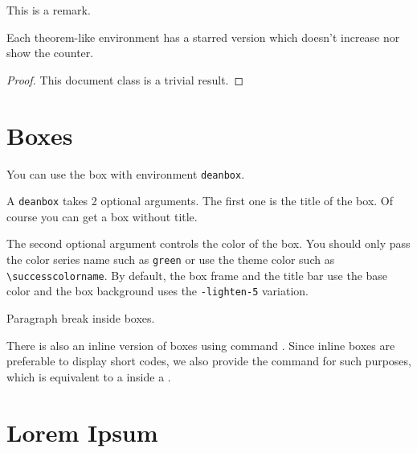 \documentclass[lineno=off]{wunschnote}
\begin{document}
    \begin{remark}
        This is a remark.
    \end{remark}

    \begin{remark*}
        Each theorem-like environment has a starred version which doesn't increase nor show the counter.
    \end{remark*}

    \begin{proof}
        This document class is a trivial result.
    \end{proof}

    \section{Boxes}
    \label{sec:boxes}
    \begin{wunschbox}
        You can use the box with environment \verb|deanbox|.
    \end{wunschbox}

    \begin{wunschbox}[]
        A \verb|deanbox| takes 2 optional arguments. The first one is the title of the box. Of course you can get a box without title.
    \end{wunschbox}

    \begin{wunschbox}
        The second optional argument controls the color of the box. You should only pass the color series name such as \verb|green| or use the theme color such as \verb|\successcolorname|. By default, the box frame and the title bar use the base color and the box background uses the \verb|-lighten-5| variation.
        \par 
        Paragraph break inside boxes.
    \end{wunschbox}

    There is also an inline version of boxes using command . Since inline boxes are preferable to display short codes, we also provide the command  for such purposes, which is equivalent to a  inside a .

    \section{Lorem Ipsum}
    \lipsum
\end{document}
